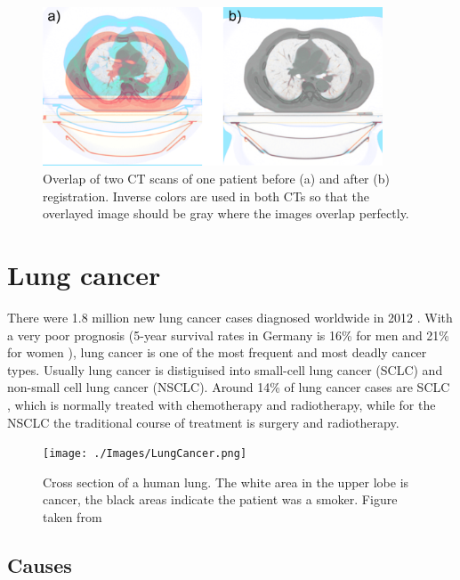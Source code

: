 \documentclass[type=dr, dr=rernat, accentcolor=tud7b,colorbacktitle, bigchapter, openright, twoside, 12pt ]{tudthesis}
\begin{document}
\begin{figure}[H]
\begin{center}
\includegraphics[width=0.9\textwidth]{./Images/RegistrationCompare.png}
\caption{Overlap of two CT scans of one patient before (a) and after (b) registration. Inverse colors are used in both CTs so that the overlayed image should be gray
where the images overlap perfectly.}
\label{RegistrationCompare}
\end{center}
\end{figure}

\section{Lung cancer}

There were 1.8 million new lung cancer cases diagnosed worldwide in 2012 \cite{Worldwide2012}. With a very poor prognosis (5-year survival rates in Germany is 
16\% for men and 21\% for women \cite{Kaatsch2014}), lung cancer is one of the most frequent and most deadly cancer types. Usually lung cancer is distiguised
into small-cell lung cancer (SCLC) and non-small cell lung cancer (NSCLC). Around 14\% of lung cancer cases are SCLC \cite{Tsao2008}, which is normally treated with chemotherapy and radiotherapy, while for the NSCLC the traditional course of treatment
is surgery and radiotherapy.

\begin{figure}[H]
	\begin{center}
		\texttt{[image: ./Images/LungCancer.png]}
		\caption{Cross section of a human lung. The white area in the upper lobe is cancer, the black areas indicate the patient was a smoker. Figure taken from \cite{LungCancer}}
		\label{Fig:Stages}
	\end{center}
\end{figure}


\subsection{Causes}
\end{document}
